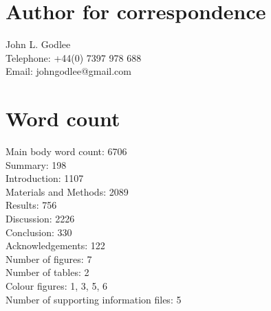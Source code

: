 \documentclass[11pt,a4paper]{article}
\begin{document}
\section*{Author for correspondence}

John L. Godlee \\
Telephone: +44(0) 7397 978 688 \\
Email: johngodlee@gmail.com \\

\section*{Word count}

Main body word count: 6706 \\
Summary: 198 \\
Introduction: 1107 \\
Materials and Methods: 2089 \\
Results: 756 \\
Discussion: 2226 \\
Conclusion: 330 \\
Acknowledgements: 122 \\
Number of figures: 7 \\
Number of tables: 2 \\
Colour figures: 1, 3, 5, 6 \\
Number of supporting information files: 5 \\
\end{document}
